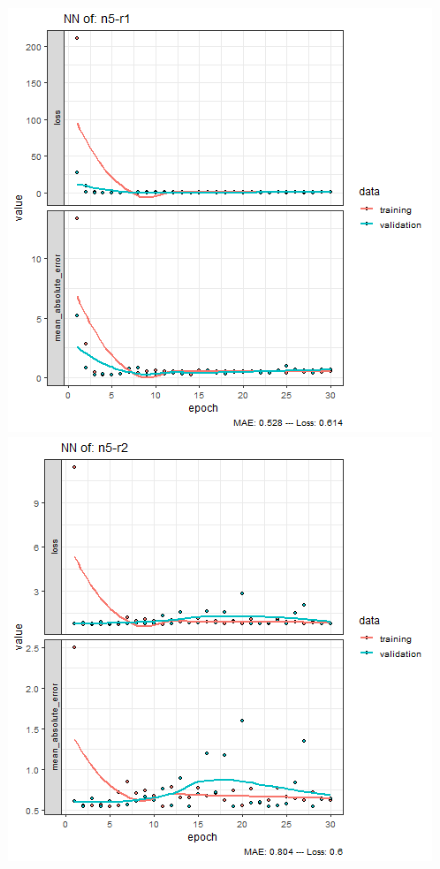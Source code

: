 \documentclass{FR16}
\begin{document}
\begin{figure}[!htb]
   
   \begin{minipage}{0.33\textwidth}
     \centering
     \includegraphics[width=1\linewidth]{figures/NN-n5-r1.png} 
   \end{minipage}\hfill
   \begin{minipage}{0.33\textwidth}
     \centering
     \includegraphics[width=1\linewidth]{figures/NN-n5-r2.png}

\end{minipage}
\end{figure}
\end{document}
